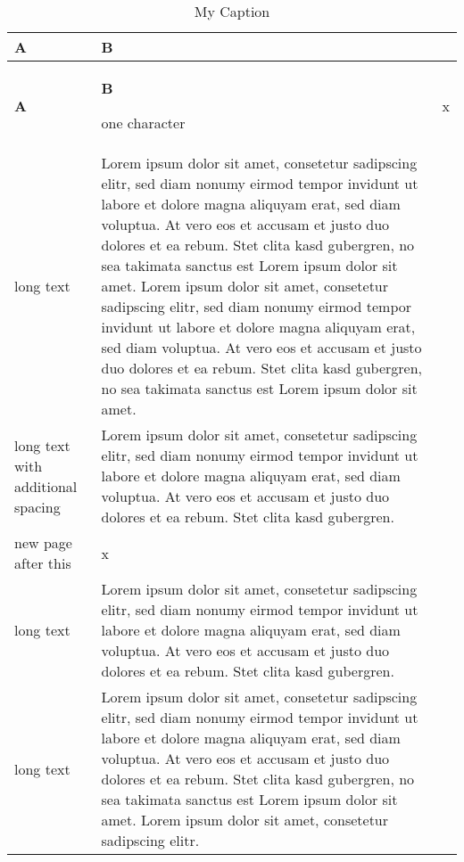 \documentclass[12pt,oneside]{scrartcl}
\begin{document}
\begingroup
\renewcommand{\arraystretch}{1.3}%
\setlength\belowtabulinesep{2mm}
\begin{longtabu} to \textwidth {|X[-1]|X|}
\caption{My Caption}\label{tab:label}\\
\hline
{}
\textbf{A} & \textbf{B}
\\
\endfirsthead

\hline
{}
\textbf{A} & \textbf{B}
\endhead
\hline

one character
    &
x
\\\hline

long text
    &
Lorem ipsum dolor sit amet, consetetur sadipscing elitr, sed diam nonumy eirmod tempor invidunt ut labore et dolore magna aliquyam erat, sed diam voluptua. At vero eos et accusam et justo duo dolores et ea rebum. Stet clita kasd gubergren, no sea takimata sanctus est Lorem ipsum dolor sit amet. Lorem ipsum dolor sit amet, consetetur sadipscing elitr, sed diam nonumy eirmod tempor invidunt ut labore et dolore magna aliquyam erat, sed diam voluptua. At vero eos et accusam et justo duo dolores et ea rebum. Stet clita kasd gubergren, no sea takimata sanctus est Lorem ipsum dolor sit amet.
\\\hline

long text with additional spacing
    &
Lorem ipsum dolor sit amet, consetetur sadipscing elitr, sed diam nonumy eirmod tempor invidunt ut labore et dolore magna aliquyam erat, sed diam voluptua. At vero eos et accusam et justo duo dolores et ea rebum. Stet clita kasd gubergren.

\\\hline

new page after this
    &
x
\\\hline

long text
    &
Lorem ipsum dolor sit amet, consetetur sadipscing elitr, sed diam nonumy eirmod tempor invidunt ut labore et dolore magna aliquyam erat, sed diam voluptua. At vero eos et accusam et justo duo dolores et ea rebum. Stet clita kasd gubergren.
\\\hline

long text
    &
Lorem ipsum dolor sit amet, consetetur sadipscing elitr, sed diam nonumy eirmod tempor invidunt ut labore et dolore magna aliquyam erat, sed diam voluptua. At vero eos et accusam et justo duo dolores et ea rebum. Stet clita kasd gubergren, no sea takimata sanctus est Lorem ipsum dolor sit amet. Lorem ipsum dolor sit amet, consetetur sadipscing elitr.
\\\hline

\end{longtabu}
\endgroup
\end{document}
